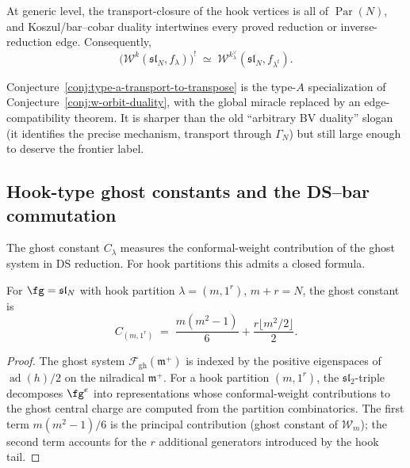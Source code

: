 \begin{conjecture}
\label{conj:type-a-transport-to-transpose}
At generic level, the transport-closure of the hook vertices is
all of $\operatorname{Par}(N)$, and Koszul/bar--cobar duality
intertwines every proved reduction or inverse-reduction edge.
Consequently,
\[
\bigl(\mathcal{W}^k(\mathfrak{sl}_N, f_\lambda)\bigr)^!
\;\simeq\;
\mathcal{W}^{k_\lambda^\vee}(\mathfrak{sl}_N, f_{\lambda^t}).
\]
\end{conjecture}

\begin{remark}
Conjecture~\ref{conj:type-a-transport-to-transpose} is the
type-$A$ specialization of Conjecture~\ref{conj:w-orbit-duality},
with the global miracle replaced by an edge-compatibility
theorem.  It is sharper than the old ``arbitrary BV duality''
slogan (it identifies the precise mechanism, transport through
$\Gamma_N$) but still large enough to deserve the frontier label.
\end{remark}

\subsection{Hook-type ghost constants and the DS--bar commutation}
\label{sec:hook-ghost-ds-bar}

The ghost constant $C_\lambda$ measures the conformal-weight
contribution of the ghost system in DS reduction.
For hook partitions this admits a closed formula.

\begin{proposition}
\label{prop:hook-ghost-constant}
For $\fg = \mathfrak{sl}_N$ with hook partition
$\lambda = (m, 1^r)$, $m + r = N$, the ghost constant is
\begin{equation}\label{eq:hook-ghost-constant}
C_{(m,1^r)} \;=\; \frac{m(m^2-1)}{6}
  + \frac{r \lfloor m^2/2 \rfloor}{2}.
\end{equation}
\end{proposition}

\begin{proof}
The ghost system $\mathcal{F}_{\mathrm{gh}}(\mathfrak{m}^+)$
is indexed by the positive eigenspaces of $\operatorname{ad}(h)/2$
on the nilradical $\mathfrak{m}^+$.  For a hook partition
$(m,1^r)$, the $\mathfrak{sl}_2$-triple decomposes $\fg^e$ into
representations whose conformal-weight contributions to the
ghost central charge are computed from the partition combinatorics.
The first term $m(m^2-1)/6$ is the principal contribution
(ghost constant of $\mathcal{W}_m$); the second term accounts for
the $r$ additional generators introduced by the hook tail.
\end{proof}

